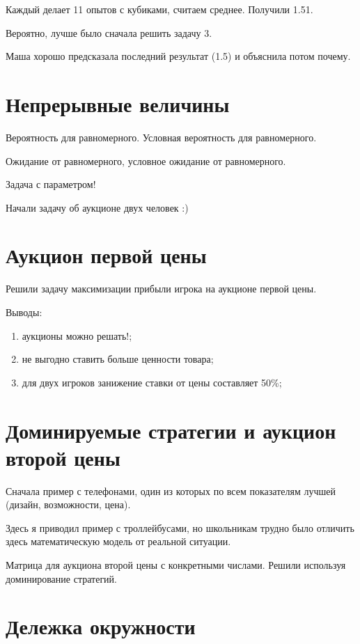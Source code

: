 \documentclass[a4paper, 12pt]{article}
\begin{document}
Каждый делает 11 опытов с кубиками, считаем среднее. Получили 1.51.

Вероятно, лучше было сначала решить задачу 3.

Маша хорошо предсказала последний результат (1.5) и объяснила потом почему.

\section{Непрерывные величины}

Вероятность для равномерного. Условная вероятность для равномерного.

Ожидание от равномерного, условное ожидание от равномерного.

Задача с параметром!

Начали задачу об аукционе двух человек :)

\section{Аукцион первой цены}

Решили задачу максимизации прибыли игрока на аукционе первой цены.

Выводы:

\begin{enumerate}
\item аукционы можно решать!;
\item не выгодно ставить больше ценности товара;
\item для двух игроков занижение ставки от цены составляет 50\%;
\end{enumerate}

\section{Доминируемые стратегии и аукцион второй цены}

Сначала пример с телефонами, один из которых по всем показателям лучшей (дизайн, возможности, цена).

Здесь я приводил пример с троллейбусами, но школьникам трудно было отличить здесь математическую модель от реальной ситуации.

Матрица для аукциона второй цены с конкретными числами. Решили используя доминирование стратегий.

\section{Дележка окружности}
\end{document}
